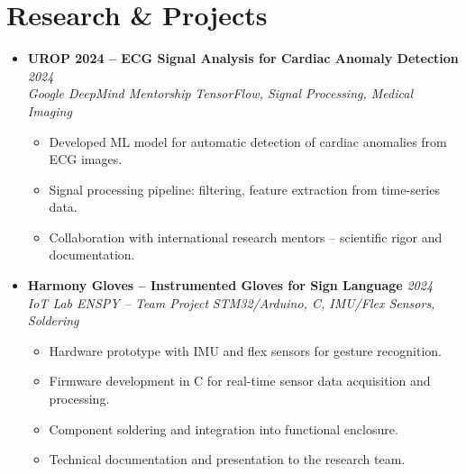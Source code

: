 \documentclass[a4paper,11pt]{article}
\begin{document}
\section{Research \& Projects}
\begin{itemize}[leftmargin=*, label={-}]

\item \textbf{UROP 2024 -- ECG Signal Analysis for Cardiac Anomaly Detection} \hfill \textit{2024} \\
\textit{Google DeepMind Mentorship} \hfill \textit{TensorFlow, Signal Processing, Medical Imaging}
\vspace{-2pt}
    \begin{itemize}[leftmargin=0.4cm, nosep, label=\tiny$\bullet$]
        \item \small{Developed ML model for automatic detection of cardiac anomalies from ECG images.}
        \item \small{Signal processing pipeline: filtering, feature extraction from time-series data.}
        \item \small{Collaboration with international research mentors -- scientific rigor and documentation.}
    \end{itemize}
\vspace{3pt}

\item \textbf{Harmony Gloves -- Instrumented Gloves for Sign Language} \hfill \textit{2024} \\
\textit{IoT Lab ENSPY -- Team Project} \hfill \textit{STM32/Arduino, C, IMU/Flex Sensors, Soldering}
\vspace{-2pt}
    \begin{itemize}[leftmargin=0.4cm, nosep, label=\tiny$\bullet$]
        \item \small{Hardware prototype with IMU and flex sensors for gesture recognition.}
        \item \small{Firmware development in C for real-time sensor data acquisition and processing.}
        \item \small{Component soldering and integration into functional enclosure.}
        \item \small{Technical documentation and presentation to the research team.}
    \end{itemize}
\vspace{3pt}


\end{itemize}
\end{document}
